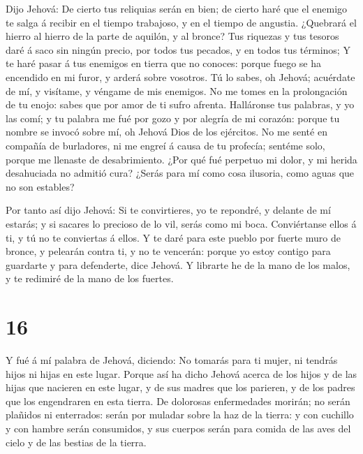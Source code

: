  Dijo Jehová: De cierto tus reliquias serán en bien; de
cierto haré que el enemigo te salga á recibir en el tiempo trabajoso, y
en el tiempo de angustia.  ¿Quebrará el hierro al hierro de
la parte de aquilón, y al bronce?  Tus riquezas y tus
tesoros daré á saco sin ningún precio, por todos tus pecados, y en todos
tus términos;  Y te haré pasar á tus enemigos en tierra que
no conoces: porque fuego se ha encendido en mi furor, y arderá sobre
vosotros.  Tú lo sabes, oh Jehová; acuérdate de mí, y
visítame, y véngame de mis enemigos. No me tomes en la prolongación de
tu enojo: sabes que por amor de ti sufro afrenta. 
Halláronse tus palabras, y yo las comí; y tu palabra me fué por gozo y
por alegría de mi corazón: porque tu nombre se invocó sobre mí, oh
Jehová Dios de los ejércitos.  No me senté en compañía de
burladores, ni me engreí á causa de tu profecía; sentéme solo, porque me
llenaste de desabrimiento.  ¿Por qué fué perpetuo mi dolor,
y mi herida desahuciada no admitió cura? ¿Serás para mí como cosa
ilusoria, como aguas que no son estables?

 Por tanto así dijo Jehová: Si te convirtieres, yo te
repondré, y delante de mí estarás; y si sacares lo precioso de lo vil,
serás como mi boca. Conviértanse ellos á ti, y tú no te conviertas á
ellos.  Y te daré para este pueblo por fuerte muro de
bronce, y pelearán contra ti, y no te vencerán: porque yo estoy contigo
para guardarte y para defenderte, dice Jehová.  Y librarte
he de la mano de los malos, y te redimiré de la mano de los fuertes.

\hypertarget{section-15}{%
\section{16}\label{section-15}}

 Y fué á mí palabra de Jehová, diciendo:  No
tomarás para ti mujer, ni tendrás hijos ni hijas en este lugar.
 Porque así ha dicho Jehová acerca de los hijos y de las
hijas que nacieren en este lugar, y de sus madres que los parieren, y de
los padres que los engendraren en esta tierra.  De dolorosas
enfermedades morirán; no serán plañidos ni enterrados: serán por muladar
sobre la haz de la tierra: y con cuchillo y con hambre serán consumidos,
y sus cuerpos serán para comida de las aves del cielo y de las bestias
de la tierra.


